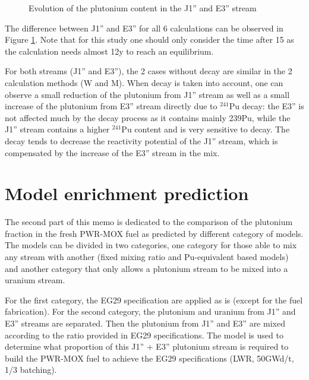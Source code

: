 \documentclass[12pt]{article}
\begin{document}
\begin{figure}[h!]
  \centering
  \caption{Evolution of the plutonium content in the J1'' and  E3'' stream\label{fig:MW_flow} }
\end{figure}

The difference between J1'' and E3'' for all 6 calculations can be observed in
Figure \ref{fig:MW_flow}. Note that for this study one should only consider the time
after 15 as the calculation needs almost 12y to reach an equilibrium. 

For both streams (J1'' and E3''), the 2 cases without decay are similar in the 2
calculation methods (W and M). When decay is taken into account, one can
observe a small reduction of the plutonium from  J1'' stream as well as a small
increase of the plutonium from E3'' stream directly due to $^{241}$Pu decay: the E3''
is not affected much by the decay process as it contains mainly 239Pu, while the J1''
stream contains a higher $^{241}$Pu content and is very sensitive to decay.  The decay tends
to decrease the reactivity potential of the J1'' stream, which is compensated by
the increase of the E3'' stream in the mix.


\section{Model enrichment prediction}

The second part of this memo is dedicated to the comparison of the plutonium
fraction in the fresh PWR-MOX fuel as predicted by different category of models.
The models can be divided in two categories, one category for those able to mix
any stream with another (fixed mixing ratio and Pu-equivalent based models) and
another category that only allows a plutonium stream to be mixed into a uranium
stream.  

For the first category, the EG29 specification are applied as is (except for the
fuel fabrication). For the second category, the plutonium and uranium from J1''
and E3'' streams are separated.  Then the plutonium from J1'' and E3'' are mixed
according to the ratio provided in EG29 specifications. The model is used to
determine what proportion of this J1'' + E3'' plutonium stream is required to
build the PWR-MOX fuel to achieve the EG29 specifications (LWR, 50GWd/t, 1/3
batching).
\end{document}
